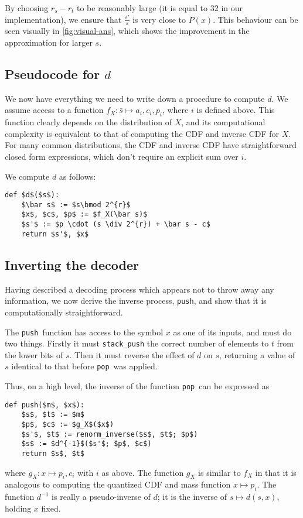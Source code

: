 \documentclass{article}
\theoremstyle{definition}
\newcommand{\push}{\texttt{push}}
\newcommand{\pop}{\texttt{pop}}
\begin{document}
By choosing \(r_s - r_t\) to be reasonably
large (it is equal to 32 in our implementation), we ensure that
\(\frac{s'}{s}\) is very close to \(P(x)\). This behaviour can be seen visually
in \cref{fig:visual-ans}, which shows the improvement in the approximation for
larger \(s\).

\subsection{Pseudocode for \(d\)}
We now have everything we need to write down a procedure to compute \(d\). We
assume access to a function \(f_X:\bar{s}\mapsto a_i, c_i, p_i\), where \(i\)
is defined above. This function clearly depends on the distribution of \(X\), and
its computational complexity is equivalent to that of computing the CDF and
inverse CDF for \(X\). For many common distributions, the CDF and inverse CDF
have straightforward closed form expressions, which don't require an explicit
sum over \(i\).

\pagebreak
We compute \(d\) as follows:
\begin{lstlisting}[frame=single]
def $d$($s$):
    $\bar s$ := $s\bmod 2^{r}$
    $x$, $c$, $p$ := $f_X(\bar s)$
    $s'$ := $p \cdot (s \div 2^{r}) + \bar s - c$
    return $s'$, $x$
\end{lstlisting}

\subsection{Inverting the decoder}
Having described a decoding process which appears not to throw away any
information, we now derive the inverse process, \push, and show that it is
computationally straightforward.

The \push\ function has access to the symbol \(x\) as one of its inputs, and
must do two things. Firstly it must \texttt{stack\_push} the correct number of
elements to \(t\) from the lower bits of \(s\). Then it must reverse the effect
of \(d\) on \(s\), returning a value of \(s\) identical to that before \pop\
was applied.

Thus, on a high level, the inverse of the function \pop\ can be expressed as
\begin{lstlisting}[frame=single]
def push($m$, $x$):
    $s$, $t$ := $m$
    $p$, $c$ := $g_X$($x$)
    $s'$, $t$ := renorm_inverse($s$, $t$; $p$)
    $s$ := $d^{-1}$($s'$; $p$, $c$)
    return $s$, $t$
\end{lstlisting}
where \(g_X:x\mapsto p_i, c_i\) with \(i\) as above. The function \(g_X\) is
similar to \(f_X\) in that it is analogous to computing the quantized CDF and
mass function \(x \mapsto p_i\).  The function \(d^{-1}\) is really a
pseudo-inverse of \(d\); it is the inverse of \(s\mapsto d(s, x)\), holding
\(x\) fixed.
\end{document}
